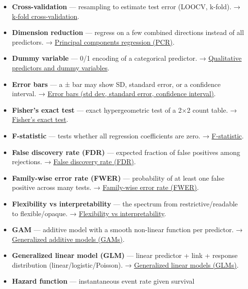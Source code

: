 \documentclass[
  10pt,
  letterpaper,
  onecolumn]{article}
\begin{document}
\begin{itemize}
{  hazards model}.
\item
  \textbf{Cross-validation} --- resampling to estimate test error
  (LOOCV, k-fold). → \protect\hyperlink{k-fold-cross-validation}{k-fold
  cross-validation}.
\item
  \textbf{Dimension reduction} --- regress on a few combined directions
  instead of all predictors. →
  \protect\hyperlink{principal-components-regression-pcr}{Principal
  components regression (PCR)}.
\item
  \textbf{Dummy variable} --- 0/1 encoding of a categorical predictor. →
  \protect\hyperlink{qualitative-predictors-and-dummy-variables}{Qualitative
  predictors and dummy variables}.
\item
  \textbf{Error bars} --- a ± bar may show SD, standard error, or a
  confidence interval. →
  \protect\hyperlink{error-bars-std-dev-standard-error-confidence-interval}{Error
  bars (std dev, standard error, confidence interval)}.
\item
  \textbf{Fisher's exact test} --- exact hypergeometric test of a 2×2
  count table. → \protect\hyperlink{fishers-exact-test}{Fisher's exact
  test}.
\item
  \textbf{F-statistic} --- tests whether all regression coefficients are
  zero. → \protect\hyperlink{f-statistic}{F-statistic}.
\item
  \textbf{False discovery rate (FDR)} --- expected fraction of false
  positives among rejections. →
  \protect\hyperlink{false-discovery-rate-fdr}{False discovery rate
  (FDR)}.
\item
  \textbf{Family-wise error rate (FWER)} --- probability of at least one
  false positive across many tests. →
  \protect\hyperlink{family-wise-error-rate-fwer}{Family-wise error rate
  (FWER)}.
\item
  \textbf{Flexibility vs interpretability} --- the spectrum from
  restrictive/readable to flexible/opaque. →
  \protect\hyperlink{flexibility-vs-interpretability}{Flexibility vs
  interpretability}.
\item
  \textbf{GAM} --- additive model with a smooth non-linear function per
  predictor. →
  \protect\hyperlink{generalized-additive-models-gams}{Generalized
  additive models (GAMs)}.
\item
  \textbf{Generalized linear model (GLM)} --- linear predictor + link +
  response distribution (linear/logistic/Poisson). →
  \protect\hyperlink{generalized-linear-models-glms}{Generalized linear
  models (GLMs)}.
\item
  \textbf{Hazard function} --- instantaneous event rate given survival

\end{itemize}
\end{document}
